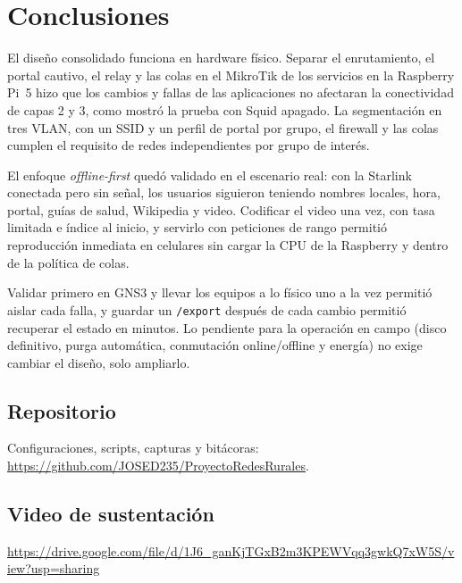 \documentclass[conference]{IEEEtran}
\begin{document}
\section{Conclusiones}
El diseño consolidado funciona en hardware físico. Separar el enrutamiento, el portal cautivo, el relay y las colas en el MikroTik de los servicios en la Raspberry Pi~5 hizo que los cambios y fallas de las aplicaciones no afectaran la conectividad de capas 2 y 3, como mostró la prueba con Squid apagado. La segmentación en tres VLAN, con un SSID y un perfil de portal por grupo, el firewall y las colas cumplen el requisito de redes independientes por grupo de interés.

El enfoque \textit{offline-first} quedó validado en el escenario real: con la Starlink conectada pero sin señal, los usuarios siguieron teniendo nombres locales, hora, portal, guías de salud, Wikipedia y video. Codificar el video una vez, con tasa limitada e índice al inicio, y servirlo con peticiones de rango permitió reproducción inmediata en celulares sin cargar la CPU de la Raspberry y dentro de la política de colas.

Validar primero en GNS3 y llevar los equipos a lo físico uno a la vez permitió aislar cada falla, y guardar un \texttt{/export} después de cada cambio permitió recuperar el estado en minutos. Lo pendiente para la operación en campo (disco definitivo, purga automática, conmutación online/offline y energía) no exige cambiar el diseño, solo ampliarlo.

\subsection*{Repositorio}
Configuraciones, scripts, capturas y bitácoras: \url{https://github.com/JOSED235/ProyectoRedesRurales}.

\subsection*{Video de sustentaci\'on}
\url{https://drive.google.com/file/d/1J6_ganKjTGxB2m3KPEWVqq3gwkQ7xW5S/view?usp=sharing}
\end{document}
